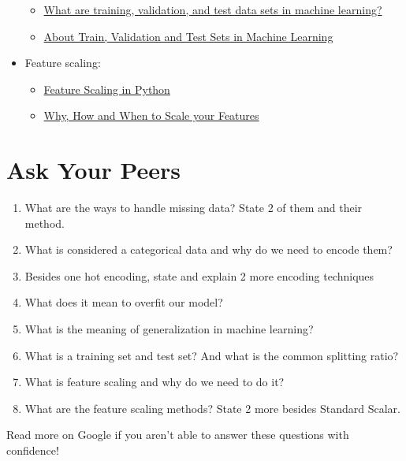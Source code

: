 \documentclass{42-en}
\begin{document}
\begin{itemize}
\begin{itemize}
            \item \href{https://medium.com/datadriveninvestor/what-are-training-validation-and-test-data-sets-in-machine-learning-d1dd1ab09bae}{What are training, validation, and test data sets in machine learning?}
            \item \href{https://towardsdatascience.com/train-validation-and-test-sets-72cb40cba9e7}{About Train, Validation and Test Sets in Machine Learning}
    \end{itemize}
    \item Feature scaling:
    \begin{itemize}
            \item \href{https://medium.com/@ian.dzindo01/feature-scaling-in-python-a59cc72147c1}{Feature Scaling in Python}
            \item \href{https://medium.com/greyatom/why-how-and-when-to-scale-your-features-4b30ab09db5e}{Why, How and When to Scale your Features}
    \end{itemize}
\end{itemize}

\chapter{Ask Your Peers}

\begin{enumerate}
    \item What are the ways to handle missing data? State 2 of them and their method.
    \item What is considered a categorical data and why do we need to encode them?
    \item Besides one hot encoding, state and explain 2 more encoding techniques
    \item What does it mean to overfit our model?
    \item What is the meaning of generalization in machine learning?
    \item What is a training set and test set? And what is the common splitting ratio?
    \item What is feature scaling and why do we need to do it?
    \item What are the feature scaling methods? State 2 more besides Standard Scalar.
\end{enumerate}

Read more on Google if you aren't able to answer these questions with confidence!
\end{document}
